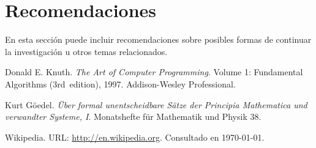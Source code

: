 \documentclass[a4paper,10pt,twocolumn]{article}
\begin{document}
\section{Recomendaciones}\label{sec:rec}

  En esta sección puede incluir recomendaciones sobre posibles formas de continuar
  la investigación u otros temas relacionados.




\begin{thebibliography}{99}
	 Donald E. Knuth. \emph{The Art of Computer Programming}.
		Volume 1: Fundamental Algorithms (3rd~edition), 1997.
		Addison-Wesley Professional.

	 Kurt Göedel. \emph{Über formal unentscheidbare Sätze der
		Principia Mathematica und verwandter Systeme, I}.
		Monatshefte für Mathematik und Physik 38.

	 Wikipedia. URL: \href{http://en.wikipedia.org}
	  {http://en.wikipedia.org}.
		Consultado en \today.

\end{thebibliography}


\label{end}
\end{document}
